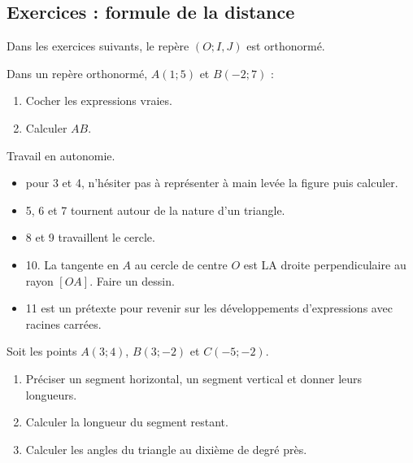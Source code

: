 \documentclass[main.tex]{subfiles}
\begin{document}
\subsection{Exercices : formule de la distance} 
\begin{eBox}
	Dans les exercices suivants, le repère $(O;I,J)$ est orthonormé.
\end{eBox} 
\begin{exercise}\label{chapter06:exercice:distances:comprendre} 
	Dans un repère orthonormé, $A(1;5)$ et $B(-2;7)$ :
	\begin{enumerate}[leftmargin=*,label=\alph*)]
		\item Cocher les expressions vraies.
		
		\item Calculer $AB$. 
	\end{enumerate} 
\end{exercise} 
\begin{eBox}
	Travail en autonomie. 
	\begin{itemize}
		\item pour 3 et 4, n'hésiter pas à représenter à main levée la figure puis calculer.
		\item 5, 6 et 7 tournent autour de la nature d'un triangle.
		\item 8 et 9 travaillent le cercle.
		\item 10. La tangente en $A$ au cercle de centre $O$ est LA droite perpendiculaire au rayon $[OA]$. Faire un dessin.
		\item 11 est un prétexte pour revenir sur les développements d'expressions avec racines carrées.
	\end{itemize}
\end{eBox}
\begin{exercise} 
	Soit les points $A(3;4)$, $B(3;-2)$ et $C(-5;-2)$.
	\begin{enumerate}[leftmargin=*,label=\alph*)]
		\item Préciser un segment horizontal, un segment vertical et donner leurs longueurs.
		\item Calculer la longueur du segment restant.
		\item Calculer les angles du triangle au dixième de degré près.
	\end{enumerate}
\end{exercise} 
\end{document}
